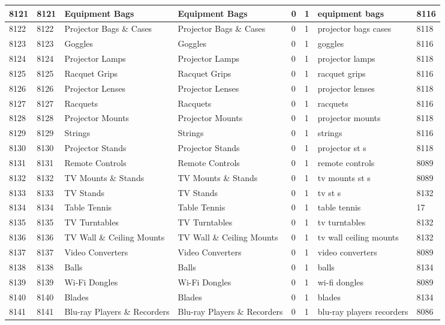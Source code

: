 \begin{longtable}{|l|l|l|l|l|l|l|l|}
8121 & 8121 & Equipment Bags & Equipment Bags & 0 & 1 & equipment bags & 8116 \\ \hline 
8122 & 8122 & Projector Bags \& Cases & Projector Bags \& Cases & 0 & 1 & projector bags cases & 8118 \\ \hline 
8123 & 8123 & Goggles & Goggles & 0 & 1 & goggles & 8116 \\ \hline 
8124 & 8124 & Projector Lamps & Projector Lamps & 0 & 1 & projector lamps & 8118 \\ \hline 
8125 & 8125 & Racquet Grips & Racquet Grips & 0 & 1 & racquet grips & 8116 \\ \hline 
8126 & 8126 & Projector Lenses & Projector Lenses & 0 & 1 & projector lenses & 8118 \\ \hline 
8127 & 8127 & Racquets & Racquets & 0 & 1 & racquets & 8116 \\ \hline 
8128 & 8128 & Projector Mounts & Projector Mounts & 0 & 1 & projector mounts & 8118 \\ \hline 
8129 & 8129 & Strings & Strings & 0 & 1 & strings & 8116 \\ \hline 
8130 & 8130 & Projector Stands & Projector Stands & 0 & 1 & projector st s & 8118 \\ \hline 
8131 & 8131 & Remote Controls & Remote Controls & 0 & 1 & remote controls & 8089 \\ \hline 
8132 & 8132 & TV Mounts \& Stands & TV Mounts \& Stands & 0 & 1 & tv mounts st s & 8089 \\ \hline 
8133 & 8133 & TV Stands & TV Stands & 0 & 1 & tv st s & 8132 \\ \hline 
8134 & 8134 & Table Tennis & Table Tennis & 0 & 1 & table tennis & 17 \\ \hline 
8135 & 8135 & TV Turntables & TV Turntables & 0 & 1 & tv turntables & 8132 \\ \hline 
8136 & 8136 & TV Wall \& Ceiling Mounts & TV Wall \& Ceiling Mounts & 0 & 1 & tv wall ceiling mounts & 8132 \\ \hline 
8137 & 8137 & Video Converters & Video Converters & 0 & 1 & video converters & 8089 \\ \hline 
8138 & 8138 & Balls & Balls & 0 & 1 & balls & 8134 \\ \hline 
8139 & 8139 & Wi-Fi Dongles & Wi-Fi Dongles & 0 & 1 & wi-fi dongles & 8089 \\ \hline 
8140 & 8140 & Blades & Blades & 0 & 1 & blades & 8134 \\ \hline 
8141 & 8141 & Blu-ray Players \& Recorders & Blu-ray Players \& Recorders & 0 & 1 & blu-ray players recorders & 8086 \\ \hline 

\end{longtable}
